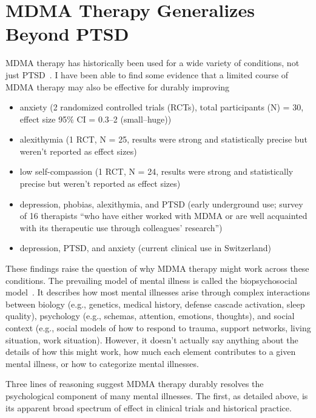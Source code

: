 \documentclass[11pt,oneside]{book}
\let\cite\parencite
\begin{document}
\section{MDMA Therapy Generalizes Beyond PTSD}
\label{biopsychosocial}
MDMA therapy has historically been used for a wide variety of conditions, not just PTSD~\cite{passieHistory}. I have been able to find some evidence that a limited course of MDMA therapy may also be effective for durably improving
\begin{itemize}
    \item anxiety (2 randomized controlled trials (RCTs), total participants (N) = 30, effect size 95\% CI = 0.3--2 (small--huge))~\cite{højlundGRADE}
    \item alexithymia (1 RCT, N = 25, results were strong and statistically precise but weren't reported as effect sizes)~\cite{vanSelfExperience}
    \item low self-compassion (1 RCT, N = 24, results were strong and statistically precise but weren't reported as effect sizes)~\cite{vanSelfExperience}
    \item depression, phobias, alexithymia, and PTSD (early underground use; survey of 16 therapists \enquote{who have either worked with MDMA or are well acquainted with its therapeutic use through colleagues' research}) \textcite[Association for the Responsible Use of Psychedelic Agents (1984), as cited in][ch. Early use in psychotherapy: A survey of MDMA therapists]{passieHistory}
    \item depression, PTSD, and anxiety (current clinical use in Switzerland)~\cite{liechtiSwitzerland}
\end{itemize}

These findings raise the question of why MDMA therapy might work across these conditions. The prevailing model of mental illness is called the biopsychosocial model~\cite{engel1977need}. It describes how most mental illnesses arise through complex interactions between biology (e.g., genetics, medical history, defense cascade activation, sleep quality), psychology (e.g., schemas, attention, emotions, thoughts), and social context (e.g., social models of how to respond to trauma, support networks, living situation, work situation). However, it doesn't actually say anything about the details of how this might work, how much each element contributes to a given mental illness, or how to categorize mental illnesses.

Three lines of reasoning suggest MDMA therapy durably resolves the psychological component of many mental illnesses. The first, as detailed above, is its apparent broad spectrum of effect in clinical trials and historical practice.
\end{document}
